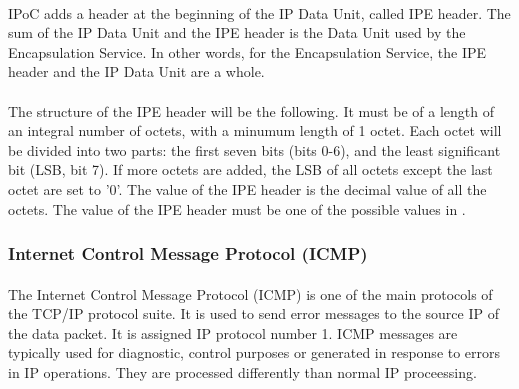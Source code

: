 \documentclass[12pt,a4paper]{report}
\begin{document}
\paragraph{}IPoC adds a header at the beginning of the IP Data Unit, called IPE header. The sum of the IP Data Unit and the IPE header is the Data Unit used by the Encapsulation Service. In other words, for the Encapsulation Service, the IPE header and the IP Data Unit are a whole.
\paragraph{}The structure of the IPE header will be the following. It must be of a length of an integral number of octets, with a minumum length of 1 octet. Each octet will be divided into two parts: the first seven bits (bits 0-6), and the least significant bit (LSB, bit 7). If more octets are added, the LSB of all octets except the last octet are set to '0'. The value of the IPE header is the decimal value of all the octets. The value of the IPE header must be one of the possible values in \cite{SANAIPE}.

\subsubsection{Internet Control Message Protocol (ICMP)\cite{ICMP}}
\paragraph{}The Internet Control Message Protocol (ICMP) is one of the main protocols of the TCP/IP protocol suite. It is used to send error messages to the source IP of the data packet. It is assigned IP protocol number 1. ICMP messages are typically used for diagnostic, control purposes or generated in response to errors in IP operations. They are processed differently than normal IP proceessing.
\end{document}
